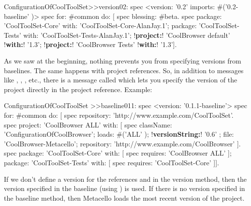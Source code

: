 \documentclass[a4paper,10pt,twoside]{book}
\begin{document}
\begin{code}{}
ConfigurationOfCoolToolSet>>version02: spec 
       <version: '0.2' imports: #('0.2-baseline' )>
       spec for: #common do: [
              spec blessing: #beta.
              spec 
                     package: 'CoolToolSet-Core' with: 'CoolToolSet-Core-AlanJay.1';
                     package: 'CoolToolSet-Tests' with: 'CoolToolSet-Tests-AlanJay.1';
                     !\textbf{project:}! 'CoolBrowser default' !\textbf{with:}! '1.3';
                     !\textbf{project:}! 'CoolBrowser Tests' !\textbf{with:}! '1.3'].
\end{code}


As we saw at the beginning, nothing prevents you from specifying versions from baselines. The same happens with project references. So, in addition to messages like , , , etc., there is a message called  which lets you specify the version of the project directly in the project reference. Example:

\begin{code}{}
ConfigurationOfCoolToolSet >>baseline011: spec 
       <version: '0.1.1-baseline'>
       spec for: #common do: [
              spec repository: 'http://www.example.com/CoolToolSet'.
              spec project: 'CoolBrowser ALL' with: [
                            spec 
                                   className: 'ConfigurationOfCoolBrowser';
                                   loads: #('ALL' );
                                   !\textbf{versionString:}! '0.6' ;
                                   file: 'CoolBrowser-Metacello';
                                   repository: 'http://www.example.com/CoolBrowser' ].
              spec 
                     package: 'CoolToolSet-Core' with: [ spec requires: 'CoolBrowser ALL' ];
                     package: 'CoolToolSet-Tests' with: [ spec requires: 'CoolToolSet-Core' ]].
\end{code}       

If we don't define a version for the references   and  in the version method, then the version specified in the baseline (using ) is used.  If there is no version specified in the baseline method, then Metacello loads the most recent version of the project.
\end{document}
